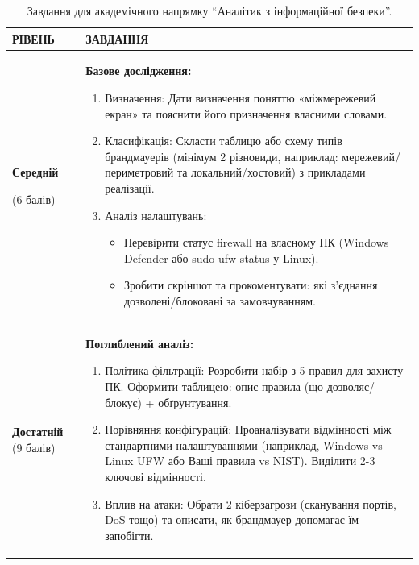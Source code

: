{\small \setlength \tabcolsep {0.4\tabcolsep }
\begin{table}[h!]
\caption{Завдання для академічного напрямку ``Аналітик з інформаційної безпеки''.}
\label{tab:lab3_acad_task} %
\noindent %


\begin{tabular}{
  | >{\raggedright\arraybackslash}p{} 
  | >{\raggedright\arraybackslash}p{} |
}
\hline

\rowcolor{TableHeaderBlue}
\hfil \color{white}\textbf{РІВЕНЬ} & 
\hfil \color{white}\textbf{ЗАВДАННЯ} \\ \hline

\small \textbf{Середній} 

(6 балів) &
\small \textbf{Базове дослідження:}
\begin{enumerate}
    \item  Визначення: Дати визначення поняттю «міжмережевий екран» та пояснити його призначення власними словами.
    \item Класифікація: Скласти таблицю або схему типів брандмауерів (мінімум 2 різновиди, наприклад: мережевий/периметровий та локальний/хостовий) з прикладами реалізації.
    \item Аналіз налаштувань:
    \begin{itemize}
        \item Перевірити статус firewall на власному ПК (Windows Defender або sudo ufw status у Linux).
        \item Зробити скріншот та прокоментувати: які з'єднання дозволені/блоковані за замовчуванням.
    \end{itemize}    
    
\end{enumerate} \\ \hline

\small \textbf{Достатній} (9 балів)&
\small \textbf{Поглиблений аналіз:}
\begin{enumerate}
    \item  Політика фільтрації: Розробити набір з 5 правил для захисту ПК. Оформити таблицею: опис правила (що дозволяє/блокує) + обґрунтування.
    \item Порівняння конфігурацій: Проаналізувати відмінності між стандартними налаштуваннями (наприклад, Windows vs Linux UFW або Ваші правила vs NIST). Виділити 2-3 ключові відмінності.
    \item Вплив на атаки: Обрати 2 кіберзагрози (сканування портів, DoS тощо) та описати, як брандмауер допомагає їм запобігти.
\end{enumerate} \\ \hline


\end{tabular}
\end{table}}
